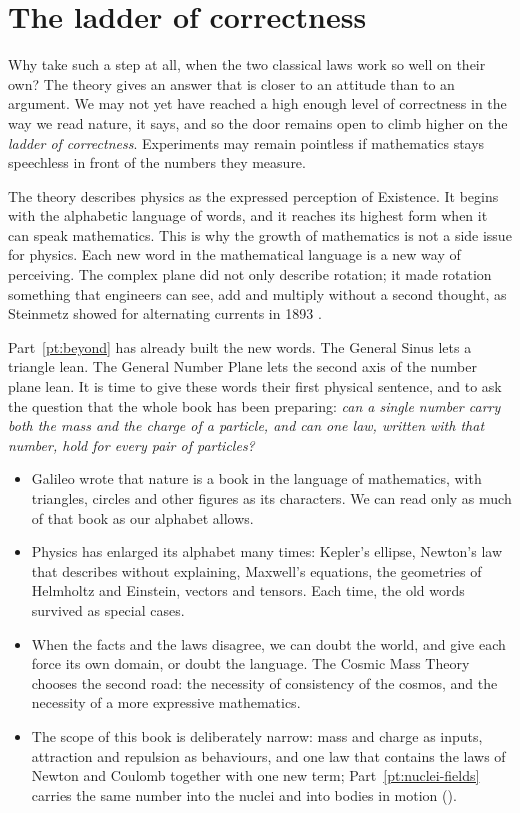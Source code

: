 \section{The ladder of correctness}\label{sec:ladder-correctness}

Why take such a step at all, when the two classical laws work so well on their own? The theory gives an answer that is closer to an attitude than to an argument. We may not yet have reached a high enough level of correctness in the way we read nature, it says, and so the door remains open to climb higher on the \emph{ladder of correctness}. Experiments may remain pointless if mathematics stays speechless in front of the numbers they measure.

The theory describes physics as the expressed perception of Existence. It begins with the alphabetic language of words, and it reaches its highest form when it can speak mathematics. This is why the growth of mathematics is not a side issue for physics. Each new word in the mathematical language is a new way of perceiving. The complex plane did not only describe rotation; it made rotation something that engineers can see, add and multiply without a second thought, as Steinmetz showed for alternating currents in 1893 \citep{Steinmetz1893}.

Part~\ref{pt:beyond} has already built the new words. The General Sinus lets a triangle lean. The General Number Plane lets the second axis of the number plane lean. It is time to give these words their first physical sentence, and to ask the question that the whole book has been preparing: \emph{can a single number carry both the mass and the charge of a particle, and can one law, written with that number, hold for every pair of particles?}

\begin{plainwords}
\begin{itemize}
  \item Galileo wrote that nature is a book in the language of mathematics, with triangles, circles and other figures as its characters. We can read only as much of that book as our alphabet allows.
  \item Physics has enlarged its alphabet many times: Kepler's ellipse, Newton's law that describes without explaining, Maxwell's equations, the geometries of Helmholtz and Einstein, vectors and tensors. Each time, the old words survived as special cases.
  \item When the facts and the laws disagree, we can doubt the world, and give each force its own domain, or doubt the language. The Cosmic Mass Theory chooses the second road: the necessity of consistency of the cosmos, and the necessity of a more expressive mathematics.
  \item The scope of this book is deliberately narrow: mass and charge as inputs, attraction and repulsion as behaviours, and one law that contains the laws of Newton and Coulomb together with one new term; Part~\ref{pt:nuclei-fields} carries the same number into the nuclei and into bodies in motion ().
\end{itemize}
\end{plainwords}
